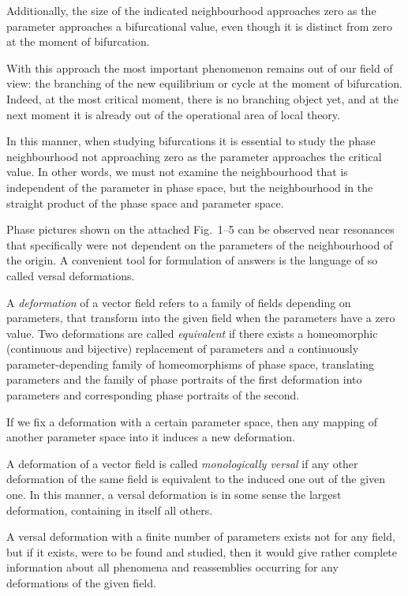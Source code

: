 \documentclass[12pt]{amsart}
\begin{document}
Additionally, the size of the indicated neighbourhood approaches zero as the
parameter approaches a bifurcational value, even though it is distinct from zero
at the moment of bifurcation.

With this approach the most important phenomenon remains out of our field of
view: the branching of the new equilibrium or cycle at the moment of
bifurcation.
Indeed, at the most critical moment, there is no branching object yet, and at
the next moment it is already out of the operational area of local theory.

In this manner, when studying bifurcations it is essential to study the phase
neighbourhood not approaching zero as the parameter approaches the critical
value.
In other words, we must not examine the neighbourhood that is independent of the
parameter in phase space, but the neighbourhood in the straight product of the
phase space and parameter space.

Phase pictures shown on the attached Fig.~1--5 can be observed near resonances
that specifically were not dependent on the parameters of the neighbourhood of
the origin.
A convenient tool for formulation of answers is the language of so called versal
deformations.

A \textit{deformation} of a vector field refers to a family of fields depending
on parameters, that transform into the given field when the parameters have a
zero value.
Two deformations are called \textit{equivalent} if there exists a homeomorphic
(continuous and bijective) replacement of parameters and a continuously
parameter-depending family of homeomorphisms of phase space,
translating parameters and the family of phase portraits of the first
deformation into parameters and corresponding phase portraits of the second.

If we fix a deformation with a certain parameter space, then any mapping of
another parameter space into it induces a new deformation.

A deformation of a vector field is called \textit{monologically versal} if any
other deformation of the same field is equivalent to the induced one out of the
given one.
In this manner, a versal deformation is in some sense the largest deformation,
containing in itself all others.

A versal deformation with a finite number of parameters exists not for any
field, but if it exists, were to be found and studied, then it would give rather
complete information about all phenomena and reassemblies occurring for any
deformations of the given field.
\end{document}
